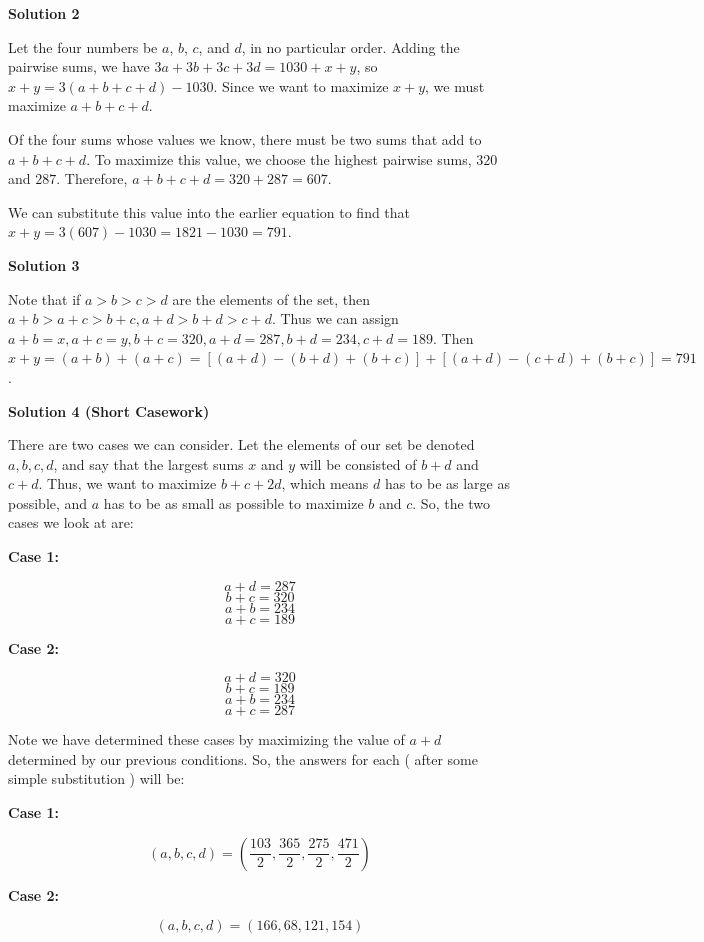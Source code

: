 \begin{enumerate}
 



\textbf{Solution 2}

Let the four numbers be $a$, $b$, $c$, and $d$, in no particular order. Adding the pairwise sums, we have $3a+3b+3c+3d=1030+x+y$, so $x+y=3(a+b+c+d)-1030$. Since we want to maximize $x+y$, we must maximize $a+b+c+d$.

 Of the four sums whose values we know, there must be two sums that add to $a+b+c+d$. To maximize this value, we choose the highest pairwise sums, $320$ and $287$. Therefore, $a+b+c+d=320+287=607$.

 We can substitute this value into the earlier equation to find that $x+y=3(607)-1030=1821-1030=\boxed{791}$.

 



\textbf{Solution 3}

Note that if $a>b>c>d$ are the elements of the set, then $a+b>a+c>b+c,a+d>b+d>c+d$. Thus we can assign $a+b=x,a+c=y,b+c=320,a+d=287,b+d=234,c+d=189$. Then $x+y=(a+b)+(a+c)=\left[(a+d)-(b+d)+(b+c)\right]+\left[(a+d)-(c+d)+(b+c)\right]=\boxed{791}$.

 



\textbf{Solution 4 (Short Casework)}

There are two cases we can consider. Let the elements of our set be denoted $a,b,c,d$, and say that the largest sums $x$ and $y$ will be consisted of $b+d$ and $c+d$. Thus, we want to maximize $b+c+2d$, which means $d$ has to be as large as possible, and $a$ has to be as small as possible to maximize $b$ and $c$. So, the two cases we look at are:

 \textbf{Case 1:}

 
 \[a+d = 287\]
 \[b+c = 320\]
 \[a+b = 234\]
 \[a+c = 189\]

 \textbf{Case 2:}

 
 \[a+d = 320\]
 \[b+c = 189\]
 \[a+b = 234\]
 \[a+c = 287\]

 Note we have determined these cases by maximizing the value of $a+d$ determined by our previous conditions. So, the answers for each ( after some simple substitution ) will be:

 \textbf{Case 1:}

 
 \[(a,b,c,d) = (\frac{103}{2},\frac{365}{2},\frac{275}{2},\frac{471}{2})\]

 \textbf{Case 2:}

 
 \[(a,b,c,d) = (166,68,121,154)\]


\end{enumerate}
